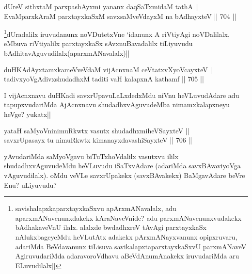 
\begin{shl}
dUreV sithxtaM parxpashAyxmi yananx daqSaTxmidaM tathA || \\
EvaMparxkAraM parxtayxkaSxM savxsaMveVdayxM na bAdhayxteV ||  704 ||  
\end{shl}

\begin{artha}
\footnote{savishalapxkaparxtayxkaSxvu apArxmANavalalx, adu  aparxmANavenunxdakekx kAraNaveVnide? adu parxmANavenunxvudakekx bAdhakaveVnU ilalx. alalxde bwdadhxreV tAvAgi parxtayxkaSx nAlukxbageyeMdu heVLutAtx adakekx pArxmANayxvanunx opipxruvaru, adariMda BeVdavanunx tiLisuva savikalapxtaparxtayxkaSxvU parxmANaveV AgiruvudariMda adaravoroVdhavu aBeVdAnumAnakekx iruvudariMda aru ELuvudilalx||}dUradalilx iruvudanunx noVDutetxVne `idanunx A riVtiyAgi noVDalilalx, eMbuva riVtiyalilx parxtayxkaSx sAvxnuBavadalilx tiLiyuvudu bAdhitavAguvudilalx(aparxmANavalalx)||
\end{artha}


\begin{shl}
duHKAdAyxtamxkameVveVdaM vijAcnxnaM ceVtatxvXyoVcayxteV || \\
tadivxyoVgAdivxshudadhxM taditi vaH kalapxnA kathamf ||  705 ||  
\end{shl}

\begin{artha}
I vijAcnxnavu duHKadi savxrUpavuLaLxdedxMdu niVnu heVLuvudAdare adu tapupxvudariMda AjAcnxnavu shudadhxvAguvudeMba nimamxkalapxneyu heVge? yukatx||
\end{artha}


\begin{shl}
yataH saMyoVninimuRkwtx vasutx shudadhxmiheVSayxteV || \\
savxrUpasayx tu nimuRkwtx kimanayxdavashiSayxteV ||  706 ||  
\end{shl}

\begin{artha}
yAvudariMda saMyoVgavu biTuTxhoVdalilx vasutxvu ililx shudadhxvAguvudeMdu heVLuvudu iSaTxvAdare (adariMda savxBAvaviyoVga vAguvudilalx). oMdu veVLe savxrUpakekx (savxBAvakekx) BaMgavAdare beVre Enu? uLiyuvudu?
\end{artha}


